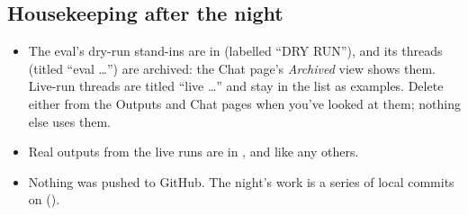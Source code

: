 \subsection*{Housekeeping after the night}
\begin{itemize}[leftmargin=*]
\item The eval's dry-run stand-ins are in  (labelled ``DRY RUN''), and its threads (titled ``eval …'') are archived: the Chat page's \emph{Archived} view shows them. Live-run threads are titled ``live …'' and stay in the list as examples. Delete either from the Outputs and Chat pages when you've looked at them; nothing else uses them.
\item Real outputs from the live runs are in ,  and  like any others.
\item Nothing was pushed to GitHub. The night's work is a series of local commits on  ().
\end{itemize}
